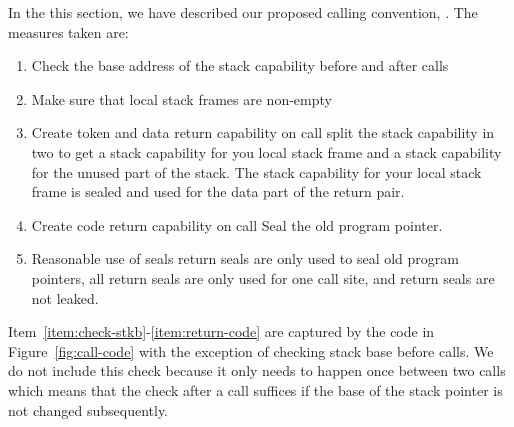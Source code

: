\documentclass[acmsmall,review,anonymous]{acmart}\settopmatter{printfolios=true,printccs=false,printacmref=false}
\begin{document}
In the this section, we have described our proposed calling convention, \stktokens{}. The measures taken are:
\begin{enumerate}
\item \label{item:check-stkb} Check the base address of the stack capability before and after calls
\item \label{item:non-empty-sf} Make sure that local stack frames are non-empty
\item \label{item:return-data} Create token and data return capability on call split the stack capability in two to get a stack capability for you local stack frame and a stack capability for the unused part of the stack. The stack capability for your local stack frame is sealed and used for the data part of the return pair.
\item \label{item:return-code} Create code return capability on call Seal the old program pointer.
\item Reasonable use of seals return seals are only used to seal old program pointers, all return seals are only used for one call site, and return seals are not leaked.
\end{enumerate}
Item~\ref{item:check-stkb}-\ref{item:return-code} are captured by the code in Figure~\ref{fig:call-code} with the exception of checking stack base before calls. We do not include this check because it only needs to happen once between two calls which means that the check after a call suffices if the base of the stack pointer is not changed subsequently.
\end{document}
